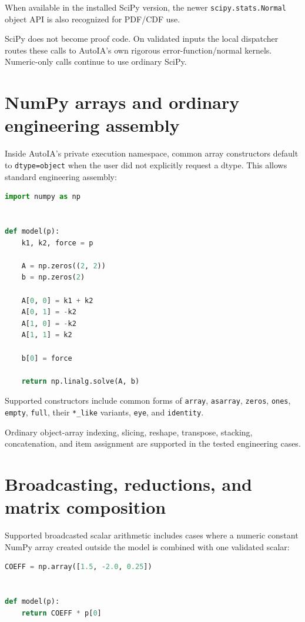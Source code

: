 \documentclass[11pt]{article}
\begin{document}
When available in the installed SciPy version, the newer
\texttt{scipy.stats.Normal} object API is also recognized for PDF/CDF use.

SciPy does not become proof code.  On validated inputs the local dispatcher
routes these calls to AutoIA's own rigorous error-function/normal kernels.
Numeric-only calls continue to use ordinary SciPy.

\section{NumPy arrays and ordinary engineering assembly}

Inside AutoIA's private execution namespace, common array constructors default to
\texttt{dtype=object} when the user did not explicitly request a dtype.  This
allows standard engineering assembly:
\begin{lstlisting}[language=Python]
import numpy as np


def model(p):
    k1, k2, force = p

    A = np.zeros((2, 2))
    b = np.zeros(2)

    A[0, 0] = k1 + k2
    A[0, 1] = -k2
    A[1, 0] = -k2
    A[1, 1] = k2

    b[0] = force

    return np.linalg.solve(A, b)
\end{lstlisting}

Supported constructors include common forms of \texttt{array}, \texttt{asarray},
\texttt{zeros}, \texttt{ones}, \texttt{empty}, \texttt{full}, their
\texttt{*\_like} variants, \texttt{eye}, and \texttt{identity}.

Ordinary object-array indexing, slicing, reshape, transpose, stacking,
concatenation, and item assignment are supported in the tested engineering cases.

\section{Broadcasting, reductions, and matrix composition}

Supported broadcasted scalar arithmetic includes cases where a numeric constant
NumPy array created outside the model is combined with one validated scalar:
\begin{lstlisting}[language=Python]
COEFF = np.array([1.5, -2.0, 0.25])


def model(p):
    return COEFF * p[0]
\end{lstlisting}
\end{document}

